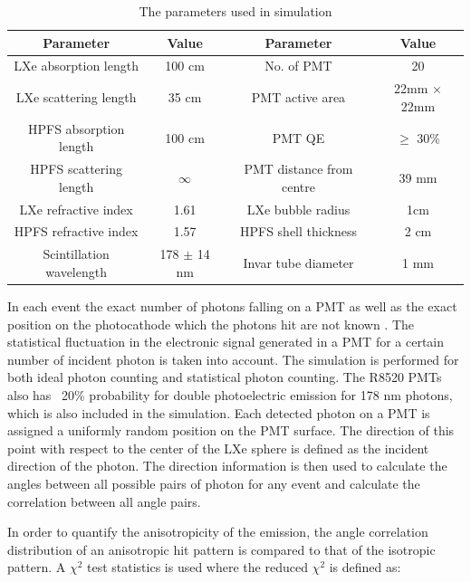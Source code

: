 \begin{table}[h]
  \centering
  \caption{The parameters used in simulation}
  \label{tab:OptPar}
  \begin{tabular}{|c c||c c|}
  \hline
  Parameter & Value & Parameter & Value \\
  \hline
  LXe absorption length & 100 cm & No. of PMT & 20\\
  LXe scattering length & 35 cm & PMT active area & 22mm $\times$ 22mm\\
  HPFS absorption length & 100 cm & PMT QE & $\geq$ 30\% \\
  HPFS scattering length & $\infty$ & PMT distance from centre & 39 mm\\
  LXe refractive index & 1.61 & LXe bubble radius & 1cm\\
  HPFS refractive index & 1.57 & HPFS shell thickness & 2 cm \\
  Scintillation wavelength & 178 $\pm$ 14 nm & Invar tube diameter & 1 mm\\
  \hline
 \end{tabular}
\end{table}

In each event the exact number of photons falling on a PMT as well as the exact position 
on the photocathode which the photons hit are not known . The statistical fluctuation 
in the electronic signal generated in a PMT for a certain number of incident photon is 
taken into account. The simulation is performed for both 
ideal photon counting and statistical photon counting. The R8520 PMTs also has  ~20\% probability 
for double photoelectric emission for 178 nm photons, which is also included in the simulation.
Each detected photon on a PMT is assigned a uniformly random position on the PMT surface. 
The direction of this point with respect 
to the center of the LXe sphere is defined as the incident direction of the photon. The direction information 
is then used to calculate the angles between all possible pairs of photon for any event and 
calculate the correlation between all angle pairs.

In order to quantify the anisotropicity of the emission, 
the angle correlation distribution of an anisotropic hit pattern is compared to that of the isotropic 
pattern. A $\chi^2$ test statistics is used where the reduced $\chi^2$ is defined as: 

